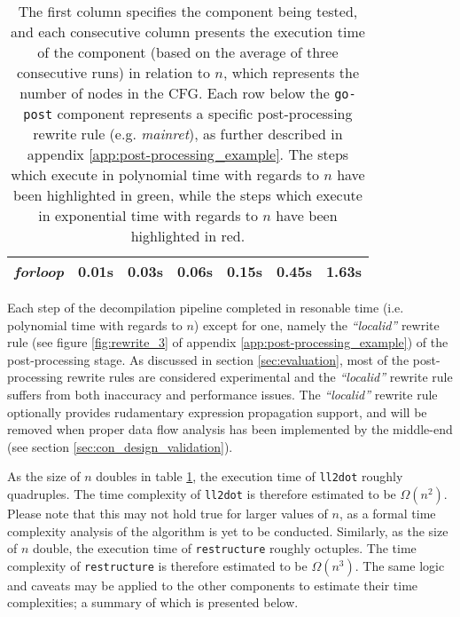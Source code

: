 \begin{table}[htbp]
\begin{center}
\begin{tabular}{|l|l|l|l|l|l|l|}
			\rowcolor{light_green_3}
			\textit{forloop} & 0.01s & 0.03s & 0.06s & 0.15s & 0.45s & 1.63s \\
			\hline
		\end{tabular}
	\end{center}
	\caption{The first column specifies the component being tested, and each consecutive column presents the execution time of the component (based on the average of three consecutive runs) in relation to $ n $, which represents the number of nodes in the CFG. Each row below the \texttt{go-post} component represents a specific post-processing rewrite rule (e.g. \textit{mainret}), as further described in appendix \ref{app:post-processing_example}. The steps which execute in polynomial time with regards to $ n $ have been highlighted in green, while the steps which execute in exponential time with regards to $ n $ have been highlighted in red.}
	\label{tbl:run_time_summary}
\end{table}

Each step of the decompilation pipeline completed in resonable time (i.e. polynomial time with regards to $ n $) except for one, namely the \textit{``localid''} rewrite rule (see figure \ref{fig:rewrite_3} of appendix \ref{app:post-processing_example}) of the post-processing stage. As discussed in section \ref{sec:evaluation}, most of the post-processing rewrite rules are considered experimental and the \textit{``localid''} rewrite rule suffers from both inaccuracy and performance issues. The \textit{``localid''} rewrite rule optionally provides rudamentary expression propagation support, and will be removed when proper data flow analysis has been implemented by the middle-end (see section \ref{sec:con_design_validation}).

As the size of $ n $ doubles in table \ref{tbl:run_time_summary}, the execution time of \texttt{ll2dot} roughly quadruples. The time complexity of \texttt{ll2dot} is therefore estimated to be $ \Omega(n^{2}) $. Please note that this may not hold true for larger values of $ n $, as a formal time complexity analysis of the algorithm is yet to be conducted. Similarly, as the size of $ n $ double, the execution time of \texttt{restructure} roughly octuples. The time complexity of \texttt{restructure} is therefore estimated to be $ \Omega(n^{3}) $. The same logic and caveats may be applied to the other components to estimate their time complexities; a summary of which is presented below.

